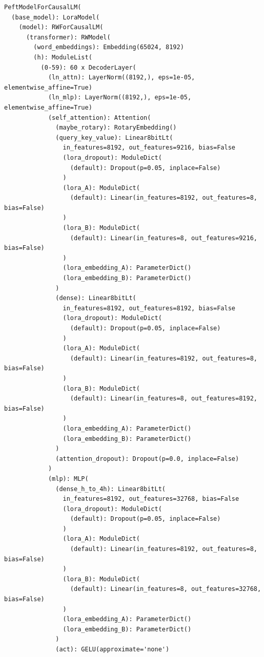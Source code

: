 \documentclass{article}
\begin{document}
\begin{small}
\begin{verbatim}
PeftModelForCausalLM(
  (base_model): LoraModel(
    (model): RWForCausalLM(
      (transformer): RWModel(
        (word_embeddings): Embedding(65024, 8192)
        (h): ModuleList(
          (0-59): 60 x DecoderLayer(
            (ln_attn): LayerNorm((8192,), eps=1e-05, elementwise_affine=True)
            (ln_mlp): LayerNorm((8192,), eps=1e-05, elementwise_affine=True)
            (self_attention): Attention(
              (maybe_rotary): RotaryEmbedding()
              (query_key_value): Linear8bitLt(
                in_features=8192, out_features=9216, bias=False
                (lora_dropout): ModuleDict(
                  (default): Dropout(p=0.05, inplace=False)
                )
                (lora_A): ModuleDict(
                  (default): Linear(in_features=8192, out_features=8, bias=False)
                )
                (lora_B): ModuleDict(
                  (default): Linear(in_features=8, out_features=9216, bias=False)
                )
                (lora_embedding_A): ParameterDict()
                (lora_embedding_B): ParameterDict()
              )
              (dense): Linear8bitLt(
                in_features=8192, out_features=8192, bias=False
                (lora_dropout): ModuleDict(
                  (default): Dropout(p=0.05, inplace=False)
                )
                (lora_A): ModuleDict(
                  (default): Linear(in_features=8192, out_features=8, bias=False)
                )
                (lora_B): ModuleDict(
                  (default): Linear(in_features=8, out_features=8192, bias=False)
                )
                (lora_embedding_A): ParameterDict()
                (lora_embedding_B): ParameterDict()
              )
              (attention_dropout): Dropout(p=0.0, inplace=False)
            )
            (mlp): MLP(
              (dense_h_to_4h): Linear8bitLt(
                in_features=8192, out_features=32768, bias=False
                (lora_dropout): ModuleDict(
                  (default): Dropout(p=0.05, inplace=False)
                )
                (lora_A): ModuleDict(
                  (default): Linear(in_features=8192, out_features=8, bias=False)
                )
                (lora_B): ModuleDict(
                  (default): Linear(in_features=8, out_features=32768, bias=False)
                )
                (lora_embedding_A): ParameterDict()
                (lora_embedding_B): ParameterDict()
              )
              (act): GELU(approximate='none')

\end{verbatim}
\end{small}
\end{document}
